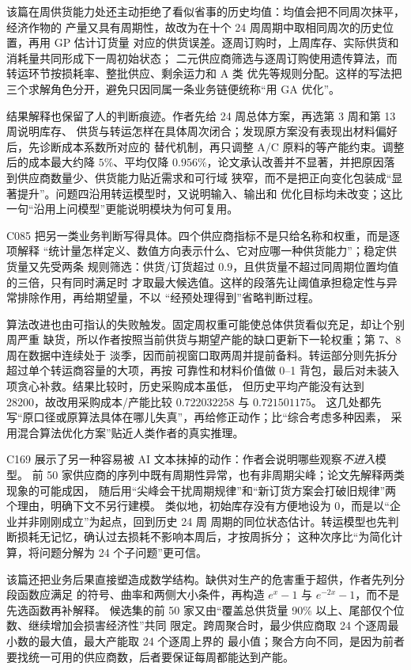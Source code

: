 \documentclass[UTF8,a4paper,12pt]{ctexart}
\begin{document}
该篇在周供货能力处还主动拒绝了看似省事的历史均值：均值会把不同周次抹平，经济作物的
产量又具有周期性，故改为在十个 24 周周期中取相同周次的历史位置，再用 GP 估计订货量
对应的供货误差。逐周订购时，上周库存、实际供货和消耗量共同形成下一周初始状态；
二元供应商筛选与逐周订购使用遗传算法，而转运环节按损耗率、整批供应、剩余运力和 A 类
优先等规则分配。这样的写法把三个求解角色分开，避免只因同属一条业务链便统称“用 GA
优化”。

结果解释也保留了人的判断痕迹。作者先给 24 周总体方案，再选第 3 周和第 13 周说明库存、
供货与转运怎样在具体周次闭合；发现原方案没有表现出材料偏好后，先诊断成本系数所对应的
替代机制，再只调整 A/C 原料的等产能约束。调整后的成本最大约降 $5\%$、平均仅降
$0.956\%$，论文承认改善并不显著，并把原因落到供应商数量少、供货能力贴近需求和可行域
狭窄，而不是把正向变化包装成“显著提升”。问题四沿用转运模型时，又说明输入、输出和
优化目标均未改变；这比一句“沿用上问模型”更能说明模块为何可复用。

C085 把另一类业务判断写得具体。四个供应商指标不是只给名称和权重，而是逐项解释
“统计量怎样定义、数值方向表示什么、它对应哪一种供货能力”；稳定供货量又先受两条
规则筛选：供货/订货超过 $0.9$，且供货量不超过同周期位置均值的三倍，只有同时满足时
才取最大候选值。这样的段落先让阈值承担稳定性与异常排除作用，再给期望量，不以
“经预处理得到”省略判断过程。

算法改进也由可指认的失败触发。固定周权重可能使总体供货看似充足，却让个别周严重
缺货，所以作者按照当前供货与期望产能的缺口更新下一轮权重；第 7、8 周在数据中连续处于
淡季，因而前视窗口取两周并提前备料。转运部分则先拆分超过单个转运商容量的大项，再按
可靠性和材料价值做 0--1 背包，最后对未装入项贪心补救。结果比较时，历史采购成本虽低，
但历史平均产能没有达到 28200，故改用采购成本/产能比较 $0.722032258$ 与 $0.721501175$。
这几处都先写“原口径或原算法具体在哪儿失真”，再给修正动作；比“综合考虑多种因素，
采用混合算法优化方案”贴近人类作者的真实推理。

C169 展示了另一种容易被 AI 文本抹掉的动作：作者会说明哪些观察\emph{不进入}模型。
前 50 家供应商的序列中既有周期性异常，也有非周期尖峰；论文先解释两类现象的可能成因，
随后用“尖峰会干扰周期规律”和“新订货方案会打破旧规律”两个理由，明确下文不另行建模。
类似地，初始库存没有方便地设为 0，而是以“企业并非刚刚成立”为起点，回到历史 24 周
周期的同位状态估计。转运模型也先判断损耗无记忆，确认过去损耗不影响本周后，才按周拆分；
这种次序比“为简化计算，将问题分解为 24 个子问题”更可信。

该篇还把业务后果直接塑造成数学结构。缺供对生产的危害重于超供，作者先列分段函数应满足
的符号、曲率和两侧大小条件，再构造 $e^x-1$ 与 $e^{-2x}-1$，而不是先选函数再补解释。
候选集的前 50 家又由“覆盖总供货量 90\% 以上、尾部仅个位数、继续增加会损害经济性”共同
限定。跨周聚合时，最少供应商取 24 个逐周最小数的最大值，最大产能取 24 个逐周上界的
最小值；聚合方向不同，是因为前者要找统一可用的供应商数，后者要保证每周都能达到产能。
\end{document}
